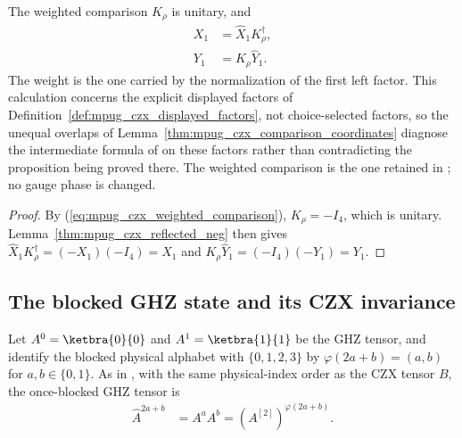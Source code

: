 \begin{lemma}
    \label{thm:mpug_czx_weighted_comparison_spec}
    \leanok
    The weighted comparison $K_\rho$ is unitary, and
    \begin{align}
        X_1 & =\widehat X_1K_\rho^\dagger, \\
        Y_1 & =K_\rho\widehat Y_1.
    \end{align}
    The weight is the one carried by the normalization of the first left
    factor. This calculation concerns the explicit displayed factors of
    Definition~\ref{def:mpug_czx_displayed_factors}, not choice-selected
    factors, so the unequal overlaps of
    Lemma~\ref{thm:mpug_czx_comparison_coordinates} diagnose the
    intermediate formula of
    \cite[lines~5438--5441]{FrancoRubio2025MPUGauging} on these factors
    rather than contradicting the proposition being proved there. The
    weighted comparison is the one retained in
    \cite{gap:fbc25_inverse_compatible_tilde_omission}; no gauge phase is
    changed.
\end{lemma}
\begin{proof}\leanok
    By (\ref{eq:mpug_czx_weighted_comparison}), $K_\rho=-I_4$, which is
    unitary. Lemma~\ref{thm:mpug_czx_reflected_neg} then gives
    $\widehat X_1K_\rho^\dagger=(-X_1)(-I_4)=X_1$ and
    $K_\rho\widehat Y_1=(-I_4)(-Y_1)=Y_1$.
\end{proof}

\subsection{The blocked GHZ state and its CZX invariance}

\begin{definition}
    \label{def:mpug_czx_blocked_ghz}
    \leanok
    Let $A^0=\ketbra{0}{0}$ and $A^1=\ketbra{1}{1}$ be the GHZ tensor,
    and identify the blocked physical alphabet with $\{0,1,2,3\}$ by
    $\varphi(2a+b)=(a,b)$ for $a,b\in\{0,1\}$. As in
    \cite[lines~4660--4670]{FrancoRubio2025MPUGauging}, with the same
    physical-index order as the CZX tensor $B$, the once-blocked GHZ
    tensor is
    \begin{align}
        \widehat A^{2a+b} & =A^aA^b=(A^{[2]})^{\varphi(2a+b)}.
    \end{align}
\end{definition}

